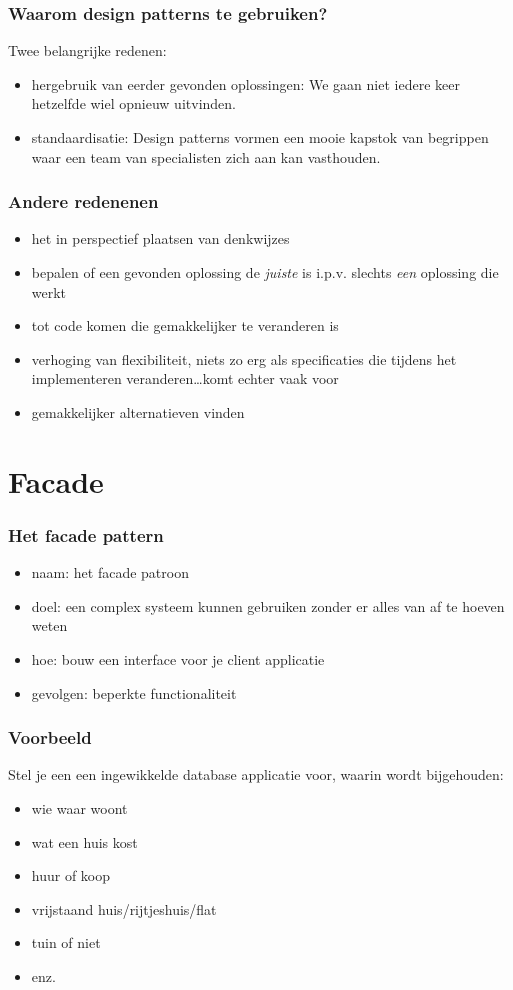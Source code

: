 \documentclass{beamer}
\begin{document}
\begin{frame} \frametitle{Waarom design patterns te gebruiken?}
  Twee belangrijke redenen:
  \begin{itemize}
  \item hergebruik van eerder gevonden oplossingen: We gaan niet iedere keer hetzelfde wiel opnieuw uitvinden.
  \item standaardisatie: Design patterns vormen een mooie kapstok van begrippen waar een team van specialisten zich aan kan vasthouden. 
  \end{itemize}
\end{frame}

\begin{frame} \frametitle{Andere redenenen}
  \begin{itemize}
  \item het in perspectief plaatsen van denkwijzes
  \item bepalen of een gevonden oplossing de \emph{juiste} is i.p.v. slechts \emph{een} oplossing die werkt
  \item tot code komen die gemakkelijker te veranderen is
  \item verhoging van flexibiliteit, niets zo erg als specificaties die tijdens het implementeren veranderen\ldots komt echter vaak voor
  \item gemakkelijker alternatieven vinden
  \end{itemize}
\end{frame}

\section{Facade}

\begin{frame} \frametitle{Het facade pattern}
  \begin{itemize}
  \item naam: het facade patroon
  \item doel: een complex systeem kunnen gebruiken zonder er alles van af te hoeven weten
  \item hoe: bouw een interface voor je client applicatie
  \item gevolgen: beperkte functionaliteit
  \end{itemize}
\end{frame}

\begin{frame}[fragile]\frametitle{Voorbeeld}
Stel je een een ingewikkelde database applicatie voor, waarin wordt bijgehouden:
\begin{itemize}
\item wie waar woont
\item wat een huis kost
\item huur of koop
\item vrijstaand huis/rijtjeshuis/flat
\item tuin of niet
\item enz.
\end{itemize}

\end{frame}
\end{document}
